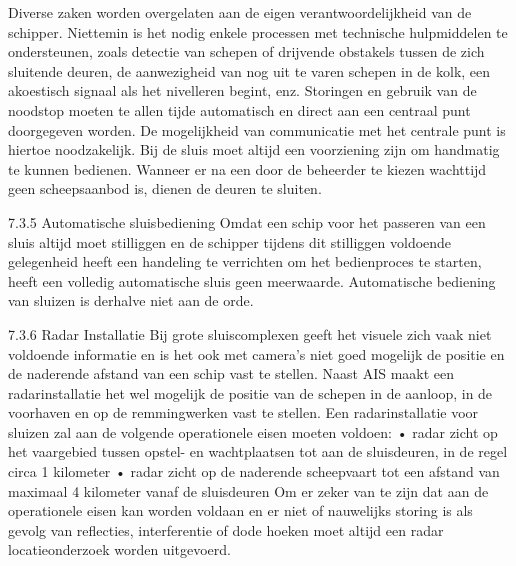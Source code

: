 Diverse zaken worden overgelaten aan de eigen verantwoordelijkheid van de schipper.
Niettemin is het nodig enkele processen met technische hulpmiddelen te ondersteunen, zoals
detectie van schepen of drijvende obstakels tussen de zich sluitende deuren, de aanwezigheid
van nog uit te varen schepen in de kolk, een akoestisch signaal als het nivelleren begint, enz.
Storingen en gebruik van de noodstop moeten te allen tijde automatisch en direct aan een
centraal punt doorgegeven worden. De mogelijkheid van communicatie met het centrale punt
is hiertoe noodzakelijk. Bij de sluis moet altijd een voorziening zijn om handmatig te kunnen
bedienen. Wanneer er na een door de beheerder te kiezen wachttijd geen scheepsaanbod is,
dienen de deuren te sluiten.

7.3.5 Automatische sluisbediening
Omdat een schip voor het passeren van een sluis altijd moet stilliggen en de schipper tijdens
dit stilliggen voldoende gelegenheid heeft een handeling te verrichten om het bedienproces te
starten, heeft een volledig automatische sluis geen meerwaarde. Automatische bediening van
sluizen is derhalve niet aan de orde.

7.3.6 Radar Installatie
Bij grote sluiscomplexen geeft het visuele zich vaak niet voldoende informatie en is het ook
met camera’s niet goed mogelijk de positie en de naderende afstand van een schip vast te
stellen. Naast AIS maakt een radarinstallatie het wel mogelijk de positie van de schepen in de
aanloop, in de voorhaven en op de remmingwerken vast te stellen. Een radarinstallatie voor
sluizen zal aan de volgende operationele eisen moeten voldoen:
• radar zicht op het vaargebied tussen opstel- en wachtplaatsen tot aan de sluisdeuren, in de
regel circa 1 kilometer
• radar zicht op de naderende scheepvaart tot een afstand van maximaal 4 kilometer vanaf de
sluisdeuren
Om er zeker van te zijn dat aan de operationele eisen kan worden voldaan en er niet of
nauwelijks storing is als gevolg van reflecties, interferentie of dode hoeken moet altijd een
radar locatieonderzoek worden uitgevoerd.

